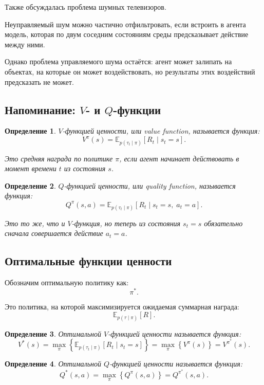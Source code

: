 \documentclass[12pt,a4paper]{article}
\newtheorem{definition}{Определение}
\begin{document}
Также обсуждалась проблема шумных телевизоров.

Неуправляемый шум можно частично отфильтровать, если встроить в агента модель, которая по двум соседним состояниям среды предсказывает действие между ними.

Однако проблема управляемого шума остаётся: агент может залипать на объектах, на которые он может воздействовать, но результаты этих воздействий предсказать не может.

\subsection{Напоминание: $V$- и $Q$-функции}

\begin{definition}
$V$-функцией ценности, или value function, называется функция:
\[
V^\pi(s)
=
\mathbb E_{p(\tau_t\mid \pi)}
\left[
R_t
\mid
s_t=s
\right].
\]

Это средняя награда по политике $\pi$, если агент начинает действовать в момент времени $t$ из состояния $s$.
\end{definition}

\begin{definition}
$Q$-функцией ценности, или quality function, называется функция:
\[
Q^\pi(s,a)
=
\mathbb E_{p(\tau_t\mid \pi)}
\left[
R_t
\mid
s_t=s,\;a_t=a
\right].
\]

Это то же, что и $V$-функция, но теперь из состояния $s_t=s$ обязательно сначала совершается действие $a_t=a$.
\end{definition}

\subsection{Оптимальные функции ценности}

Обозначим оптимальную политику как:
\[
\pi^\ast.
\]

Это политика, на которой максимизируется ожидаемая суммарная награда:
\[
\mathbb E_{p(\tau\mid \pi)}
\left[
R
\right].
\]

\begin{definition}
Оптимальной $V$-функцией ценности называется функция:
\[
V^\ast(s)
=
\max_{\pi}
\left\{
\mathbb E_{p(\tau_t\mid \pi)}
\left[
R_t
\mid
s_t=s
\right]
\right\}
=
\max_{\pi}
\left\{
V^\pi(s)
\right\}
=
V^{\pi^\ast}(s).
\]
\end{definition}

\begin{definition}
Оптимальной $Q$-функцией ценности называется функция:
\[
Q^\ast(s,a)
=
\max_{\pi}
\left\{
Q^\pi(s,a)
\right\}
=
Q^{\pi^\ast}(s,a).
\]
\end{definition}
\end{document}
